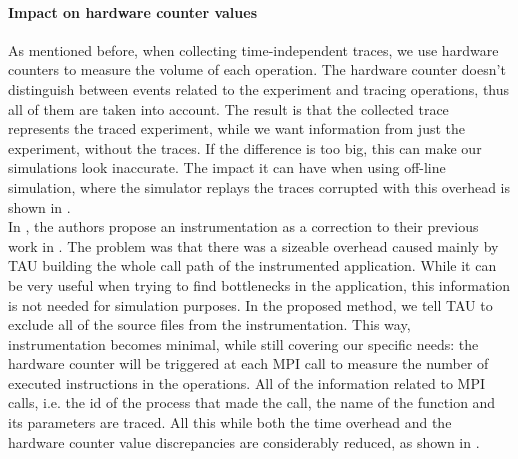 \paragraph{Impact on hardware counter values}
As mentioned before, when collecting time-independent traces, we use
hardware counters to measure the volume of each operation. The
hardware counter doesn't distinguish between events related to the
experiment and tracing operations, thus all of them are taken into
account. The result is that the collected trace represents the traced
experiment, while we want information from just the experiment,
without the traces. If the difference is too big, this can make our
simulations look inaccurate. The impact it can have when using
off-line simulation, where the simulator replays the traces corrupted
with this overhead is shown in \cite{dms12}.\\[0.5cm]
In \cite{dms12}, the authors propose an instrumentation as a
correction to their previous work in \cite{dmsq11}. The problem was
that there was a sizeable overhead caused mainly by TAU building the
whole call path of the instrumented application. While it can be
very useful when trying to find bottlenecks in the application, this
information is not needed for simulation purposes. In the proposed
method, we tell TAU to exclude all of the source files from the
instrumentation. This way, instrumentation becomes minimal, while
still covering our specific needs: the hardware counter will be
triggered at each MPI call to measure the number of executed
instructions in the operations. All of the information related to MPI
calls, i.e. the id of the process that made the call, the name of the
function and its parameters are traced. All this while both the time
overhead and the hardware counter value discrepancies are considerably
reduced, as shown in \cite{dms12}.
